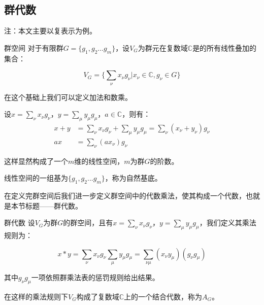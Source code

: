 

\subsection{群代数}

注：本文主要以复表示为例。

\begin{definition}{群空间}
对于有限群$G=\{g_1,g_2...g_m\}$，设$V_G$为群元在复数域$\mathbb{C}$是的所有线性叠加的集合：

\begin{equation}
V_G=\{\displaystyle\sum_\nu x_\nu g_\nu|x_\nu \in \mathbb{C},g_\nu \in G\}
\end{equation}

在这个基础上我们可以定义加法和数乘。

设$x=\displaystyle\sum_\nu x_\nu g_\nu$，$y=\displaystyle\sum_\mu y_\mu g_\mu$，$a\in \mathbb{C}$，则有：
\begin{align}
x+y&=\displaystyle\sum_\nu x_\nu g_\nu+\displaystyle\sum_\mu y_\mu g_\mu=\displaystyle\sum_\nu(x_\nu+y_\nu)g_\nu\\
ax&=\displaystyle\sum_\nu (ax_\nu) g_\nu
\end{align}

这样显然构成了一个$m$维的线性空间，$m$为群$G$的阶数。

线性空间的一组基为$\{g_1,g_2...g_m\}$，称为自然基底。

\end{definition}

在定义完群空间后我们进一步定义群空间中的代数乘法，使其构成一个代数，也就是本节标题——群代数。

\begin{definition}{群代数}
设$V_G$为群$G$的群空间，且有$x=\displaystyle\sum_\nu x_\nu g_\nu$，$y=\displaystyle\sum_\mu y_\mu g_\mu$，我们定义其乘法规则为：

\begin{equation}
x * y = \displaystyle \sum_{\nu} x_\nu g_\nu \sum_{\mu} y_\mu g_\mu =
\displaystyle\sum_{\nu\mu}(x_\nu y_\mu) (g_\nu g_\mu)
\end{equation}

其中$g_\nu g_\mu$一项依照群乘法表的惩罚规则给出结果。

在这样的乘法规则下$V_G$构成了复数域$\mathbb{C}$上的一个结合代数，称为$A_G$。

\end{definition}

